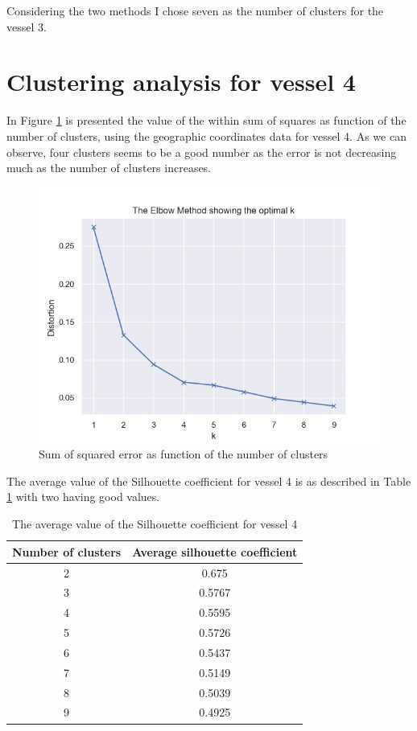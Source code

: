 Considering the two methods I chose seven as the number of clusters for the vessel 3.

\section{Clustering analysis for vessel 4} %
\label{sub:clustering_vessel_4}

In Figure \ref{fig:elbow_method_4} is presented the value of the within sum of squares as function of the number of clusters, using the geographic coordinates data for vessel 4. As we can observe, four clusters seems to be a good number as the error is not decreasing much as the number of clusters increases. 


\begin{figure}[]
\centering
\includegraphics[width=0.8\linewidth]{Chapters/img/elbow_method4.png}
\caption{Sum of squared error as function of the number of clusters}
\label{fig:elbow_method_4}
\end{figure}


The average value of the Silhouette coefficient for vessel 4 is as described in Table \ref{table:vessel4_silhouette} with two having good values.

\begin {table}[H]
\caption {The average value of the Silhouette coefficient for vessel 4}
\begin{center}
\begin{tabular}{c|c}
\textbf{Number of clusters} & \textbf{Average silhouette coefficient}  \\
\hline
2 & 0.675 \\
3 & 0.5767 \\
4 & 0.5595 \\
5 & 0.5726 \\
6 & 0.5437 \\
7 & 0.5149 \\
8 & 0.5039 \\
9 & 0.4925 
\label{table:vessel4_silhouette}
\end{tabular}
\end{center}
\end {table}

